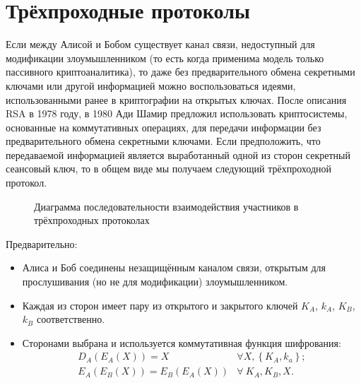 \section{Трёхпроходные протоколы}\label{section-three-pass-protocols}

Если между Алисой и Бобом существует канал связи, недоступный для модификации злоумышленником (то есть когда применима модель только пассивного криптоаналитика), то даже без предварительного обмена секретными ключами или другой информацией можно воспользоваться идеями, использованными ранее в криптографии на открытых ключах. После описания RSA в 1978 году, в 1980 Ади Шамир предложил использовать криптосистемы, основанные на коммутативных операциях, для передачи информации без предварительного обмена секретными ключами. Если предположить, что передаваемой информацией является выработанный одной из сторон секретный сеансовый ключ, то в общем виде мы получаем следующий трёхпроходной протокол.

\begin{figure}[thb]
	\centering
	\begin{sequencediagram}

	\end{sequencediagram}
	\caption{Диаграмма последовательности взаимодействия участников в трёхпроходных протоколах\label{fig:key_distribution-three-pass}}
\end{figure}

Предварительно:

\begin{itemize}
	\item Алиса и Боб соединены незащищённым каналом связи, открытым для прослушивания (но не для модификации) злоумышленником.
	\item Каждая из сторон имеет пару из открытого и закрытого ключей $K_A$, $k_A$, $K_B$, $k_B$ соответственно.
	\item Сторонами выбрана и используется коммутативная функция шифрования:
	\[\begin{array}{lll}
		D_{A} \left( E_{A} \left( X \right) \right)	= X                                       & \forall X, \left\{ K_A, k_a \right\}; \\
		E_{A} \left( E_{B} \left( X \right) \right)	= E_B \left( E_A \left( X \right) \right) & \forall ~ K_A, K_B, X.
	\end{array}\]
\end{itemize}

